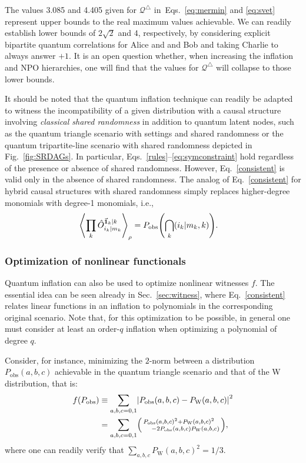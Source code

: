 \documentclass[superscriptaddress,aps,prx,nofootinbib,twocolumn,twoside,reprint,letterpaper,longbibliography]{revtex4-2}
\renewcommand{\triangle}{\bigtriangleup}
\DeclarePairedDelimiter{\expec}{\langle}{\rangle}
\DeclarePairedDelimiter{\abs}{\lvert}{\rvert}
\begin{document}
The values 3.085 and 4.405 given for $\mathcal{Q}^\triangle$ in~Eqs.~\eqref{eq:mermin} and \eqref{eq:svet} represent upper bounds to the real maximum values achievable. We can readily establish lower bounds of $2\sqrt{2}$ and $4$, respectively, by considering explicit bipartite quantum correlations for Alice and and Bob and taking Charlie to always answer $+1$. It is an open question whether, when increasing the inflation and NPO hierarchies, one will find that the values for $\mathcal{Q}^\triangle$ will collapse to those lower bounds.

It should be noted that the quantum inflation technique can readily be adapted to witness the incompatibility of a given distribution with a causal structure involving \emph{classical shared randomness} in addition to quantum latent nodes, such as the quantum triangle scenario with settings and shared randomness or the quantum tripartite-line scenario with shared randomness depicted in Fig.~\ref{fig:SRDAGs}. In particular, Eqs.~\eqref{rules}--\eqref{eq:symconstraint} hold regardless of the presence or absence of shared randomness. However, Eq.~\eqref{consistent} is valid only in the absence of shared randomness. The analog of Eq.~\eqref{consistent} for hybrid causal structures with shared randomness simply replaces higher-degree monomials with degree-1 monomials, i.e.,
\begin{align}
&\expec*{\prod_{k}\hat{O}^{\vec{\boldsymbol{1}}_{k}|k}_{i_{k}|m_{k}}}_\rho={P_\text{obs}}{\left(\bigcap_k (i_{k}|m_{k},k)\right)}.
\label{consistentSR}
\end{align}

\subsubsection{Optimization of nonlinear functionals}\label{sec:results:nonlinear}
Quantum inflation can also be used to optimize nonlinear witnesses $f$. The essential idea can be seen already in Sec.~\ref{sec:witness}, where Eq.~\eqref{consistent} relates linear functions in an inflation to polynomials in the corresponding original scenario. Note that, for this optimization to be possible, in general one must consider at least an order-$q$ inflation when optimizing a polynomial of degree $q$.

Consider, for instance, minimizing the $2$-norm between a distribution ${P_\text{obs}(a,b,c)}$ achievable in the quantum triangle scenario and that of the W distribution, that is:
\begin{align}\begin{split}
f(P_\text{obs})\equiv \sum_{a,b,c=0,1} & \abs*{P_\text{obs}(a,b,c) -P_\text{W}(a,b,c)}^2\\
=\sum_{a,b,c=0,1} & \begin{psmallmatrix*}[l]
P_\text{obs}(a,b,c)^2+P_\text{W}(a,b,c)^2\\
 \quad -2P_\text{obs}(a,b,c)P_\text{W}(a,b,c)
\end{psmallmatrix*},
\end{split}\end{align}
where one can readily verify that ${\sum_{a,b,c} P_\text{W}(a,b,c)^2 = 1/3}$.
\end{document}
